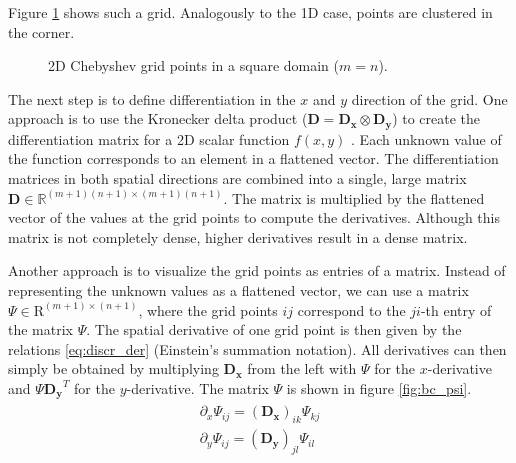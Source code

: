 Figure \ref{fig:cheb_grid2d} shows such a grid. Analogously to the 1D case,
points are clustered in the corner. \\

\begin{figure}[ht]
  \centering
  \caption{2D Chebyshev grid points in a square domain ($m = n$).}
  \label{fig:cheb_grid2d}
\end{figure}

The next step is to define differentiation in the $x$ and $y$ direction of the
grid. One approach is to use the Kronecker delta product ($\mathbf{D} =
\mathbf{D_x} \otimes \mathbf{D_y}$) to create the differentiation matrix for a
2D scalar function $f(x,y)$ \citep{trefethen2000}. Each unknown value of the
function corresponds to an element in a flattened vector. The differentiation
matrices in both spatial directions are combined into a single, large matrix
$\mathbf{D} \in \mathbb{R}^{(m+1)(n+1)\times(m+1)(n+1)}$. The matrix is
multiplied by the flattened vector of the values at the grid points to compute
the derivatives. Although this matrix is not completely dense, higher
derivatives result in a dense matrix.

Another approach is to visualize the grid points as entries of a matrix.
Instead of representing the unknown values as a flattened vector, we can use a
matrix $\Psi \in \mathrm{R}^{(m+1) \times (n+1)}$, where the grid points $ij$
correspond to the $ji$-th entry of the matrix $\Psi$. The spatial derivative of
one grid point is then given by the relations \eqref{eq:discr_der} (Einstein's
summation notation). All derivatives can then simply be obtained by multiplying
$\mathbf{D_x}$ from the left with $\Psi$ for the $x$-derivative and $\Psi
\mathbf{D_y}^T$ for the $y$-derivative. The matrix $\Psi$ is shown in figure
\ref{fig:bc_psi}.
\begin{align}
  \begin{split}
  \partial_x \Psi_{ij} = (\mathbf{D_x})_{ik} \Psi_{kj} \\
  \partial_y \Psi_{ij} = (\mathbf{D_y})_{jl} \Psi_{il}
  \end{split}
\label{eq:discr_der}
\end{align}

